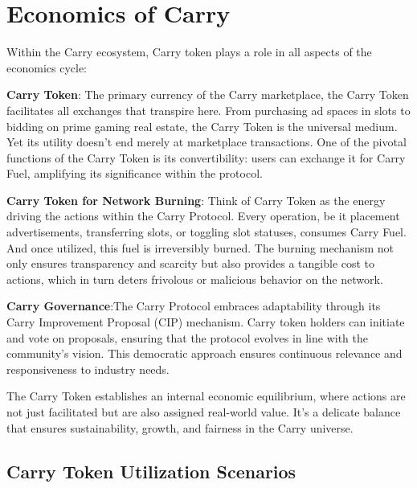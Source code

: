 \section{Economics of Carry}

Within the Carry ecosystem, Carry token plays a role in all aspects of the economics cycle:

\textbf{Carry Token}: The primary currency of the Carry marketplace, the Carry Token facilitates all exchanges that transpire here. From purchasing ad spaces in slots to bidding on prime gaming real estate, the Carry Token is the universal medium. Yet its utility doesn't end merely at marketplace transactions. One of the pivotal functions of the Carry Token is its convertibility: users can exchange it for Carry Fuel, amplifying its significance within the protocol.

\textbf{Carry Token for Network Burning}: Think of Carry Token as the energy driving the actions within the Carry Protocol. Every operation, be it placement advertisements, transferring slots, or toggling slot statuses, consumes Carry Fuel. And once utilized, this fuel is irreversibly burned. The burning mechanism not only ensures transparency and scarcity but also provides a tangible cost to actions, which in turn deters frivolous or malicious behavior on the network.

\textbf{Carry Governance}:The Carry Protocol embraces adaptability through its Carry Improvement Proposal (CIP) mechanism. Carry token holders can initiate and vote on proposals, ensuring that the protocol evolves in line with the community's vision. This democratic approach ensures continuous relevance and responsiveness to industry needs.

The Carry Token establishes an internal economic equilibrium, where actions are not just facilitated but are also assigned real-world value. It's a delicate balance that ensures sustainability, growth, and fairness in the Carry universe.

\subsection{Carry Token Utilization Scenarios}

